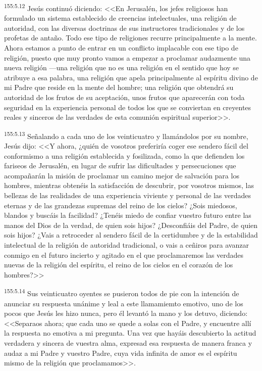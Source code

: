 \par 
\textsuperscript{155:5.12} Jesús continuó diciendo: <<En Jerusalén, los jefes religiosos han formulado un sistema establecido de creencias intelectuales, una religión de autoridad, con las diversas doctrinas de sus instructores tradicionales y de los profetas de antaño. Todo ese tipo de religiones recurre principalmente a la mente. Ahora estamos a punto de entrar en un conflicto implacable con ese tipo de religión, puesto que muy pronto vamos a empezar a proclamar audazmente una nueva religión ---una religión que no es una religión en el sentido que hoy se atribuye a esa palabra, una religión que apela principalmente al espíritu divino de mi Padre que reside en la mente del hombre; una religión que obtendrá su autoridad de los frutos de su aceptación, unos frutos que aparecerán con toda seguridad en la experiencia personal de todos los que se conviertan en creyentes reales y sinceros de las verdades de esta comunión espiritual superior>>.

\par 
\textsuperscript{155:5.13} Señalando a cada uno de los veinticuatro y llamándolos por su nombre, Jesús dijo: <<Y ahora, ¿quién de vosotros preferiría coger ese sendero fácil del conformismo a una religión establecida y fosilizada, como la que defienden los fariseos de Jerusalén, en lugar de sufrir las dificultades y persecuciones que acompañarán la misión de proclamar un camino mejor de salvación para los hombres, mientras obtenéis la satisfacción de descubrir, por vosotros mismos, las bellezas de las realidades de una experiencia viviente y personal de las verdades eternas y de las grandezas supremas del reino de los cielos? ¿Sois miedosos, blandos y buscáis la facilidad? ¿Tenéis miedo de confiar vuestro futuro entre las manos del Dios de la verdad, de quien sois hijos? ¿Desconfiáis del Padre, de quien sois hijos? ¿Vais a retroceder al sendero fácil de la certidumbre y de la estabilidad intelectual de la religión de autoridad tradicional, o vais a ceñiros para avanzar conmigo en el futuro incierto y agitado en el que proclamaremos las verdades nuevas de la religión del espíritu, el reino de los cielos en el corazón de los hombres?>>

\par 
\textsuperscript{155:5.14} Sus veinticuatro oyentes se pusieron todos de pie con la intención de anunciar su respuesta unánime y leal a este llamamiemto emotivo, uno de los pocos que Jesús les hizo nunca, pero él levantó la mano y los detuvo, diciendo: <<Separaos ahora; que cada uno se quede a solas con el Padre, y encuentre allí la respuesta no emotiva a mi pregunta. Una vez que hayáis descubierto la actitud verdadera y sincera de vuestra alma, expresad esa respuesta de manera franca y audaz a mi Padre y vuestro Padre, cuya vida infinita de amor es el espíritu mismo de la religión que proclamamos>>.

